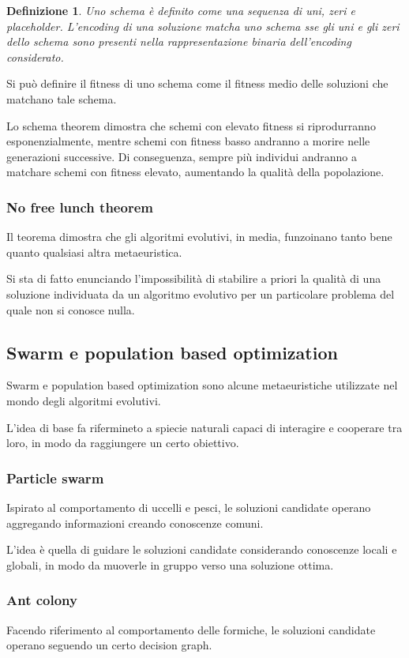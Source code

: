 \documentclass[a4paper]{article}
\newtheorem{definition}{Definizione}
\begin{document}
\begin{definition}
    Uno schema è definito come una sequenza di uni, zeri e placeholder.
    L'encoding di una soluzione matcha uno schema sse gli uni e gli zeri dello schema sono 
    presenti nella rappresentazione binaria dell'encoding considerato.
\end{definition}

Si può definire il fitness di uno schema come il fitness medio delle soluzioni che matchano tale
schema.

Lo schema theorem dimostra che schemi con elevato fitness si riprodurranno esponenzialmente, 
mentre schemi con fitness basso andranno a morire nelle generazioni successive.
Di conseguenza, sempre più individui andranno a matchare schemi con fitness elevato, aumentando
la qualità della popolazione.

\subsubsection{No free lunch theorem}
Il teorema dimostra che gli algoritmi evolutivi, in media, funzoinano tanto bene quanto qualsiasi 
altra metaeuristica. 

Si sta di fatto enunciando l'impossibilità di stabilire a priori la qualità di una soluzione
individuata da un algoritmo evolutivo per un particolare problema del quale non si conosce nulla.

\subsection{Swarm e population based optimization}
Swarm e population based optimization sono alcune metaeuristiche utilizzate nel 
mondo degli algoritmi evolutivi.

L'idea di base fa rifermineto a spiecie naturali capaci di interagire e cooperare tra 
loro, in modo da raggiungere un certo obiettivo.

\subsubsection{Particle swarm}
Ispirato al comportamento di uccelli e pesci, le soluzioni candidate operano aggregando 
informazioni creando conoscenze comuni.

L'idea è quella di guidare le soluzioni candidate considerando conoscenze locali e 
globali, in modo da muoverle in gruppo verso una soluzione ottima.

\subsubsection{Ant colony}
Facendo riferimento al comportamento delle formiche, le soluzioni candidate 
operano seguendo un certo decision graph. 
\end{document}
